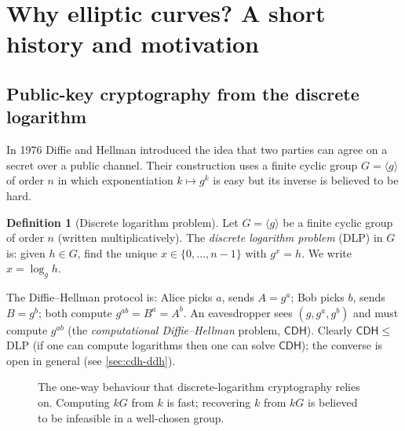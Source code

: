 \documentclass[11pt,a4paper,oneside]{book}
\theoremstyle{plain}
\theoremstyle{definition}
\newtheorem{definition}[theorem]{Definition}
\theoremstyle{remark}
\newcommand{\CDH}{\mathsf{CDH}}
\begin{document}
\section{Why elliptic curves? A short history and motivation}

\subsection{Public-key cryptography from the discrete logarithm}

In 1976 Diffie and Hellman introduced the idea that two parties can agree on a secret over a public channel.
Their construction uses a finite cyclic group $G=\langle g\rangle$ of order $n$ in which exponentiation $k\mapsto g^k$
is easy but its inverse is believed to be hard.

\begin{definition}[Discrete logarithm problem]\label{def:DLP}
Let $G=\langle g\rangle$ be a finite cyclic group of order $n$ (written multiplicatively).
The \emph{discrete logarithm problem} (DLP) in $G$ is: given $h\in G$, find the unique $x\in\{0,\dots,n-1\}$ with $g^x=h$. We write $x=\log_g h$.
\end{definition}

The Diffie--Hellman protocol is: Alice picks $a$, sends $A=g^a$; Bob picks $b$, sends $B=g^b$; both compute $g^{ab}=B^a=A^b$.
An eavesdropper sees $(g,g^a,g^b)$ and must compute $g^{ab}$ (the \emph{computational Diffie--Hellman} problem, $\CDH$).
Clearly $\CDH\le$ DLP (if one can compute logarithms then one can solve $\CDH$); the converse is open in general
(see \cref{sec:cdh-ddh}).

\begin{figure}[ht]
\centering
{}
\caption{The one-way behaviour that discrete-logarithm cryptography relies on. Computing $kG$ from $k$ is fast; recovering $k$ from $kG$ is believed to be infeasible in a well-chosen group.}
\label{fig:oneway}
\end{figure}
\end{document}
